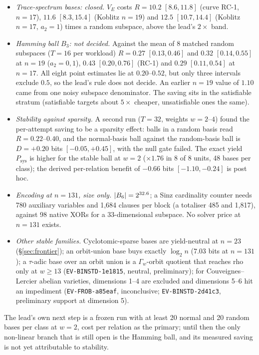 \begin{itemize}
\item \emph{Trace-spectrum bases: closed.} $V_E$ costs $R=10.2$
  $[8.6,11.8]$ (curve RC-1, $n=17$), $11.6$ $[8.3,15.4]$ (Koblitz
  $n=19$) and $12.5$ $[10.7,14.4]$ (Koblitz $n=17$, $a_2=1$) times a random
  subspace, above the lead's $2\times$ band.
\item \emph{Hamming ball $B_3$: not decided.} Against the mean of 8 matched
  random subspaces ($T=16$ per workload) $R=0.27$ $[0.13,0.46]$ and $0.32$
  $[0.14,0.55]$ at $n=19$ ($a_2=0,1$), $0.43$ $[0.20,0.76]$ (RC-1) and
  $0.29$ $[0.11,0.54]$ at $n=17$. All eight point estimates lie at
  $0.20$--$0.52$, but only three intervals exclude $0.5$, so the lead's rule
  does not decide. An earlier $n=19$ value of $1.10$ came from one noisy
  subspace denominator. The saving sits in the satisfiable stratum
  (satisfiable targets about $5\times$ cheaper, unsatisfiable ones the
  same).
\item \emph{Stability against sparsity.} A second run ($T=32$, weights
  $w=2$--$4$) found the per-attempt saving to be a sparsity effect: balls in
  a random basis read $R=0.22$--$0.40$, and the normal-basis ball against
  the random-basis ball is $D=+0.20$ bits $[-0.05,+0.45]$, with the null
  gate failed. The exact yield $P_{\text{sys}}$ is higher for the stable
  ball at $w=2$ ($\times1.76$ in 8 of 8 units, 48 bases per class); the
  derived per-relation benefit of $-0.66$ bits $[-1.10,-0.24]$ is post hoc.
\item \emph{Encoding at $n=131$, size only.} $\lvert B_6 \rvert=2^{32.6}$; a Sinz
  cardinality counter needs 780 auxiliary variables and 1{,}684 clauses per
  block (a totaliser 485 and 1{,}817), against 98 native XORs for a
  33-dimensional subspace. No solver price at $n=131$ exists.
\item \emph{Other stable families.} Cyclotomic-sparse bases are
  yield-neutral at $n=23$ (\S\ref{sec:frontier});
  an orbit-union base buys exactly $\log_2n$ ($7.03$ bits at $n=131$); a
  $\tau$-adic base over an orbit union is a $\Gamma_w$-orbit quotient that
  reaches rho only at $w\ge13$ (\texttt{EV-BINSTD-1e1815}, neutral,
  preliminary); for Couveignes--Lercier abelian varieties, dimensions 1--4
  are excluded and dimensions 5--6 hit an impediment
  (\texttt{EV-FROB-a85eaf}, inconclusive; \texttt{EV-BINSTD-2d41c3},
  preliminary support at dimension 5).
\end{itemize}
The lead's own next step is a frozen run with at least 20 normal and 20
random bases per class at $w=2$, cost per relation as the primary; until
then the only non-linear branch that is still open is the Hamming ball, and
its measured saving is not yet attributable to stability.

